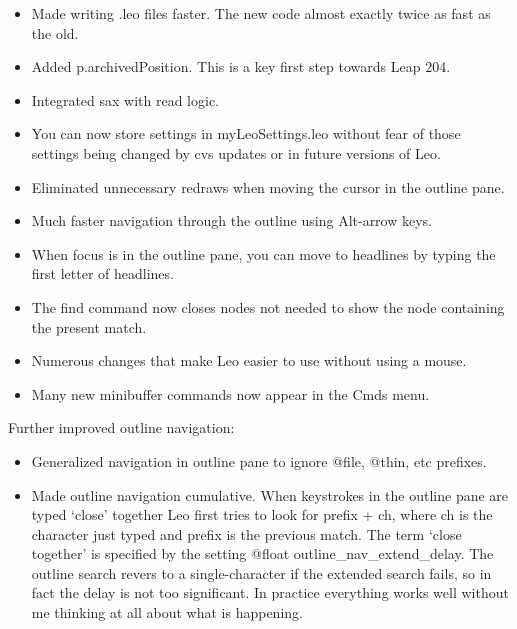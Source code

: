 \documentclass[a4paper,10pt,english]{sphinxmanual}
\begin{document}
\begin{itemize}
\item {} 
Made writing .leo files faster.
The new code almost exactly twice as fast as the old.

\item {} 
Added p.archivedPosition.
This is a key first step towards Leap 204.

\item {} 
Integrated sax with read logic.

\item {} 
You can now store settings in myLeoSettings.leo without fear of those settings
being changed by cvs updates or in future versions of Leo.

\item {} 
Eliminated unnecessary redraws when moving the cursor in the outline pane.

\item {} 
Much faster navigation through the outline using Alt-arrow keys.

\item {} 
When focus is in the outline pane, you can move to headlines by typing the first letter of headlines.

\item {} 
The find command now closes nodes not needed to show the node containing the present match.

\item {} 
Numerous changes that make Leo easier to use without using a mouse.

\item {} 
Many new minibuffer commands now appear in the Cmds menu.

\end{itemize}

Further improved outline navigation:
\begin{itemize}
\item {} 
Generalized navigation in outline pane to ignore @file, @thin, etc prefixes.

\item {} 
Made outline navigation cumulative.
When keystrokes in the outline pane are typed `close' together Leo first tries to look
for prefix + ch, where ch is the character just typed and prefix is the previous match.
The term `close together' is specified by the setting @float outline\_nav\_extend\_delay.
The outline search revers to a single-character if the extended search
fails, so in fact the delay is not too significant. In practice everything works
well without me thinking at all about what is happening.

\end{itemize}
\end{document}
